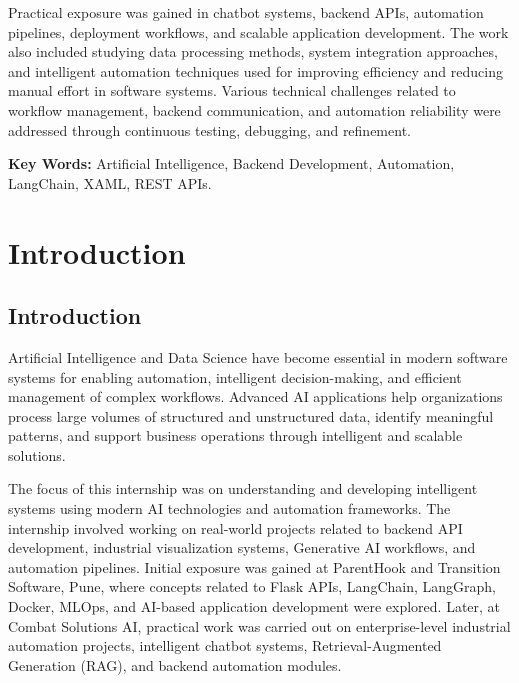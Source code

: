 \documentclass[12pt,a4paper]{report}
\begin{document}
Practical exposure was gained in chatbot systems, backend APIs, automation pipelines, deployment workflows, and scalable application development. The work also included studying data processing methods, system integration approaches, and intelligent automation techniques used for improving efficiency and reducing manual effort in software systems. Various technical challenges related to workflow management, backend communication, and automation reliability were addressed through continuous testing, debugging, and refinement.

\vspace{0.5cm}
\noindent\textbf{Key Words:} Artificial Intelligence, Backend Development, Automation, LangChain, XAML, REST APIs.

\newpage
\tableofcontents

\newpage
\listoffigures
{}

\newpage
\listoftables
{}

\setcounter{page}{1}

\chapter{Introduction}

\section{Introduction}

Artificial Intelligence and Data Science have become essential in modern software systems for enabling automation, intelligent decision-making, and efficient management of complex workflows. Advanced AI applications help organizations process large volumes of structured and unstructured data, identify meaningful patterns, and support business operations through intelligent and scalable solutions.

The focus of this internship was on understanding and developing intelligent systems using modern AI technologies and automation frameworks. The internship involved working on real-world projects related to backend API development, industrial visualization systems, Generative AI workflows, and automation pipelines. Initial exposure was gained at ParentHook and Transition Software, Pune, where concepts related to Flask APIs, LangChain, LangGraph, Docker, MLOps, and AI-based application development were explored. Later, at Combat Solutions AI, practical work was carried out on enterprise-level industrial automation projects, intelligent chatbot systems, Retrieval-Augmented Generation (RAG), and backend automation modules.
\end{document}
